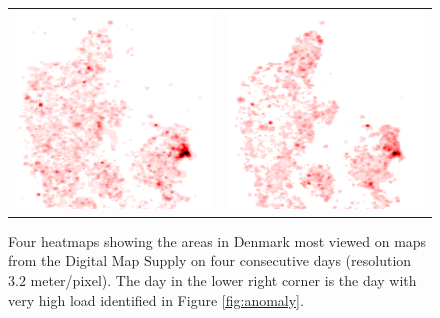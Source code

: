 \documentclass[11pt, oneside]{report}
\begin{document}
\begin{figure}
\begin{tabular}{cc}
\includegraphics[scale=0.5]{figs-tileheat/heatmap-e_3.png} & \includegraphics[scale=0.5]{figs-tileheat/heatmap-e_4.png} \\
\end{tabular}
\caption{Four heatmaps showing the areas in Denmark most viewed on maps from the Digital Map Supply on four consecutive days (resolution $\mathbf{3.2}$ meter/pixel). The day in the lower right corner is the day with very high load identified in Figure \ref{fig:anomaly}.}
\label{fig:heatmaps}
\end{figure}
\end{document}

